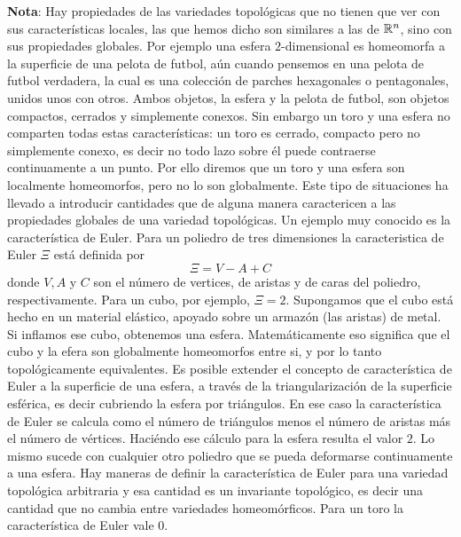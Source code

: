 {\bf Nota}:  Hay propiedades de las  variedades topol\'ogicas que  no tienen que
ver con sus  caracter\'isticas locales, las que hemos dicho  son similares a las
de  $\mathbb{R}^n$,  sino con  sus  propiedades  globales.   Por ejemplo  una  esfera
$2$-dimensional es  homeomorfa a  la superficie de  una pelota de  futbol, a\'un
cuando pensemos en una pelota de futbol verdadera, la cual es una colecci\'on de
parches hexagonales  o pentagonales,  unidos unos con  otros. Ambos  objetos, la
esfera  y la pelota  de futbol,  son objetos  compactos, cerrados  y simplemente
conexos.   Sin  embargo   un  toro  y  una  esfera   no  comparten  todas  estas
caracter\'isticas: un toro  es cerrado, compacto pero no  simplemente conexo, es
decir no  todo lazo sobre  \'el puede contraerse  continuamente a un  punto. Por
ello diremos que un toro y una esfera son localmente homeomorfos, pero no lo son
globalmente. Este tipo de situaciones  ha llevado a introducir cantidades que de
alguna  manera   caractericen  a  las  propiedades  globales   de  una  variedad
topol\'ogicas. Un ejemplo muy conocido  es la caracter\'istica de Euler. Para un
poliedro de  tres dimensiones la  caracteristica de Euler $\Xi$  est\'a definida
por
%
\[
\Xi = V - A + C
\]
%
donde  $V, A$ y  $C$ son  el n\'umero  de vertices,  de aristas  y de  caras del
poliedro, respectivamente. Para un cubo,  por ejemplo, $\Xi = 2$. Supongamos que
el cubo est\'a hecho en un  material el\'astico, apoyado sobre un armaz\'on (las
aristas) de metal. Si inflamos ese cubo, obtenemos una esfera. Matem\'aticamente
eso significa que el cubo y la efera son globalmente homeomorfos entre si, y por
lo  tanto topol\'ogicamente  equivalentes. Es  posible extender  el  concepto de
caracter\'istica  de Euler  a la  superficie  de una  esfera, a  trav\'es de  la
triangularizaci\'on de  la superficie esf\'erica,  es decir cubriendo  la esfera
por tri\'angulos.  En  ese caso la caracter\'istica de Euler  se calcula como el
n\'umero  de tri\'angulos  menos el  n\'umero de  aristas m\'as  el  n\'umero de
v\'ertices. Haci\'endo  ese c\'alculo  para la esfera  resulta el valor  $2$. Lo
mismo sucede con cualquier otro poliedro que se pueda deformarse continuamente a
una  esfera.  Hay maneras  de  definir la  caracter\'istica  de  Euler para  una
variedad topol\'ogica  arbitraria y esa cantidad es  un invariante topol\'ogico,
es decir  una cantidad que no  cambia entre variedades  homeom\'orficos. Para un
toro la caracter\'istica de Euler vale $0$.
